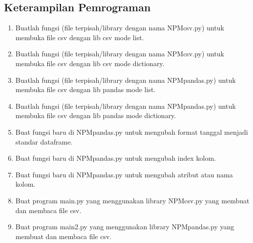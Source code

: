 \subsection{Keterampilan Pemrograman}
\begin{enumerate}
\item Buatlah  fungsi  (file  terpisah/library  dengan  nama  NPMcsv.py)  untuk  membuka file csv dengan lib csv mode list.


	

	\item Buatlah  fungsi  (file  terpisah/library  dengan  nama  NPMcsv.py)  untuk  membuka file csv dengan lib csv mode dictionary.

	

	\item Buatlah fungsi (file terpisah/library dengan nama NPMpandas.py) untuk membuka file csv dengan lib pandas mode list.

	

	\item Buatlah fungsi (file terpisah/library dengan nama NPMpandas.py) untuk membuka file csv dengan lib pandas mode dictionary.

	

	\item  Buat fungsi baru di NPMpandas.py untuk mengubah format tanggal menjadi standar dataframe.

	

	\item Buat fungsi baru di NPMpandas.py untuk mengubah index kolom.

	

	\item Buat fungsi baru di NPMpandas.py untuk mengubah atribut atau nama kolom.

	

	\item Buat program main.py yang menggunakan library NPMcsv.py yang membuat dan membaca file csv.

	

	\item Buat program main2.py yang menggunakan library NPMpandas.py yang membuat dan membaca file csv.

	
\end{enumerate}


